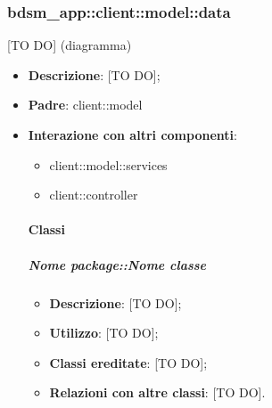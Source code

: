 %
%

%

\subsubsection{bdsm\_app::client::model::data} %
\label{ssub:bdsm_app_client_model_data}
[TO DO] (diagramma) \newline \newline

\begin{itemize}
	\item \textbf{Descrizione}: [TO DO];
	\item \textbf{Padre}: client::model
	\item \textbf{Interazione con altri componenti}:
		\begin{itemize}
			\item client::model::services
			\item client::controller
		\end{itemize}

	\paragraph{Classi} %
		\subparagraph{Nome package::Nome classe} %
		\label{subp:subparagraph_name}
			\begin{itemize}
				\item \textbf{Descrizione}: [TO DO];
				\item \textbf{Utilizzo}: [TO DO];
				\item \textbf{Classi ereditate}: [TO DO];
				\item \textbf{Relazioni con altre classi}: [TO DO].
			\end{itemize}
\end{itemize}
